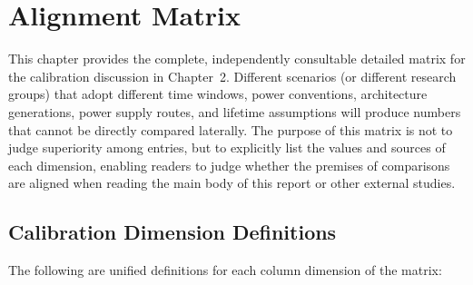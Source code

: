 
\section{Alignment Matrix}

This chapter provides the complete, independently consultable detailed matrix for the calibration discussion in Chapter~2. Different scenarios (or different research groups) that adopt different time windows, power conventions, architecture generations, power supply routes, and lifetime assumptions will produce numbers that cannot be directly compared laterally. The purpose of this matrix is not to judge superiority among entries, but to explicitly list the values and sources of each dimension, enabling readers to judge whether the premises of comparisons are aligned when reading the main body of this report or other external studies.

\subsection{Calibration Dimension Definitions}

The following are unified definitions for each column dimension of the matrix:

